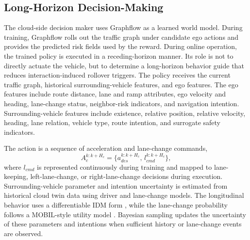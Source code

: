\subsection{Long-Horizon Decision-Making}

The cloud-side decision maker uses Graphflow as a learned world model. During training, Graphflow rolls out the traffic graph under candidate ego actions and provides the predicted risk fields used by the reward. During online operation, the trained policy is executed in a receding-horizon manner. Its role is not to directly actuate the vehicle, but to determine a long-horizon behavior guide that reduces interaction-induced rollover triggers. The policy receives the current traffic graph, historical surrounding-vehicle features, and ego features. The ego features include route distance, lane and ramp attributes, ego velocity and heading, lane-change status, neighbor-risk indicators, and navigation intention. Surrounding-vehicle features include existence, relative position, relative velocity, heading, lane relation, vehicle type, route intention, and surrogate safety indicators.

The action is a sequence of acceleration and lane-change commands,
\begin{equation}
  A_c^{k:k+H_c}
  =
  \{a_{des}^{k:k+H_c},\,l_{cmd}^{k:k+H_c}\},
  \label{eq:cloud_action}
\end{equation}
where $l_{cmd}$ is represented continuously during training and mapped to lane-keeping, left-lane-change, or right-lane-change decisions during execution. Surrounding-vehicle parameter and intention uncertainty is estimated from historical cloud twin data using driver and lane-change models. The longitudinal behavior uses a differentiable IDM form \cite{IDM_2020}, while the lane-change probability follows a MOBIL-style utility model \cite{MOBIL_1999}. Bayesian sampling updates the uncertainty of these parameters and intentions when sufficient history or lane-change events are observed.

